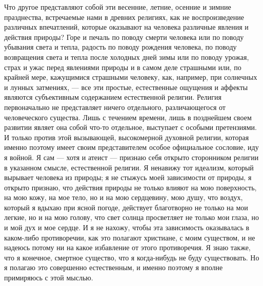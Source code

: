 \documentclass[12pt]{article}
\begin{document}
Что другое представляют собой эти весенние, летние, осенние и зимние празднества, встречаемые нами в древних религиях, как не воспроизведение различных впечатлений, которые оказывают на человека различные явления и действия природы? Горе и печаль по поводу смерти человека или по поводу убывания света и тепла, радость по поводу рождения человека, по поводу возвращения света и тепла после холодных дней зимы или по поводу урожая, страх и ужас перед явлениями природы и в самом деле страшными или, по крайней мере, кажущимися страшными человеку, как, например, при солнечных и лунных затмениях, --- все эти простые, естественные ощущения и аффекты являются субъективным содержанием естественной религии. Религия первоначально не представляет ничего отдельного, различающегося от человеческого существа. Лишь с течением времени, лишь в позднейшем своем развитии являет она собой что-то отдельное, выступает с особыми претензиями. И только против этой вызывающей, высокомерной духовной религии, которая именно поэтому имеет своим представителем особое официальное сословие, иду я войной. Я сам --- хотя и атеист --- признаю себя открыто сторонником религии в указанном смысле, естественной религии. Я ненавижу тот идеализм, который вырывает человека из природы; я не стыжусь моей зависимости от природы, я открыто признаю, что действия природы не только влияют на мою поверхность, на мою кожу, на мое тело, но и на мою сердцевину, мою душу, что воздух, который я вдыхаю при ясной погоде, действует благотворно не только на мои легкие, но и на мою голову, что свет солнца просветляет не только мои глаза, но и мой дух и мое сердце. И я не нахожу, чтобы эта зависимость оказывалась в каком-либо противоречии, как это полагают христиане, с моим существом, и не надеюсь потому ни на какое избавление от этого противоречия. Я знаю также, что я конечное, смертное существо, что я когда-нибудь не буду существовать. Но я полагаю это совершенно естественным, и именно поэтому я вполне примиряюсь с этой мыслью. 
\end{document}
